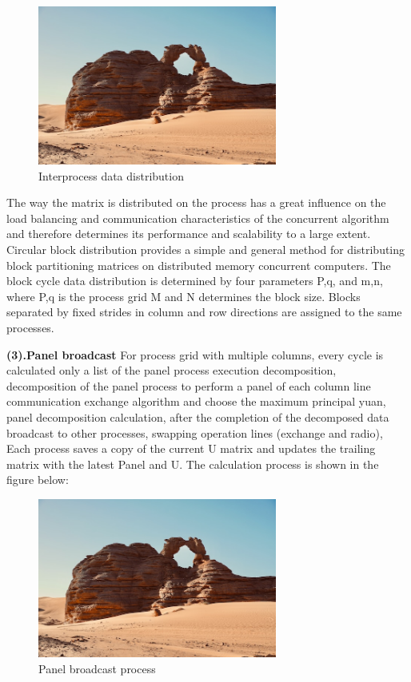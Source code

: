 \documentclass[a4paper,12pt]{article}
\begin{document}
\begin{figure}[H]
    \centering
    \includegraphics[width=0.7\textwidth]{Interprocess_data_distribution.png}
    \caption{Interprocess data distribution}
    \label{fig:interprocess_data}
\end{figure}

The way the matrix is distributed on the process has a great influence on the load balancing and communication characteristics of the concurrent algorithm and therefore determines its performance and scalability to a large extent. Circular block distribution provides a simple and general method for distributing block partitioning matrices on distributed memory concurrent computers. The block cycle data distribution is determined by four parameters P,q, and m,n, where P,q is the process grid M and N determines the block size. Blocks separated by fixed strides in column and row directions are assigned to the same processes.

\textbf{(3).Panel broadcast}
For process grid with multiple columns, every cycle is calculated only a list of the panel process execution decomposition, decomposition of the panel process to perform a panel of each column line communication exchange algorithm and choose the maximum principal yuan, panel decomposition calculation, after the completion of the decomposed data broadcast to other processes, swapping operation lines (exchange and radio), Each process saves a copy of the current U matrix and updates the trailing matrix with the latest Panel and U. The calculation process is shown in the figure below:

\begin{figure}[H]
    \centering
    \includegraphics[width=0.7\textwidth]{Panel_broadcast_process.png}
    \caption{Panel broadcast process}
    \label{fig:panel_broadcast}
\end{figure}
\end{document}
